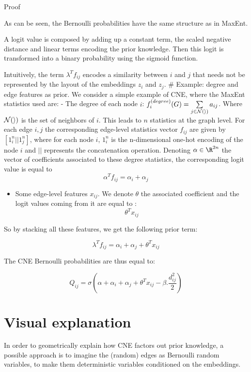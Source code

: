 Proof

As can be seen, the Bernoulli probabilities have the same structure as
in MaxEnt.

A logit value is composed by adding up a constant term, the scaled
negative distance and linear terms encoding the prior knowledge. Then
this logit is transformed into a binary probability using the sigmoid
function.

Intuitively, the term \(\lambda^Tf_{ij}\) encodes a similarity between
\(i\) and \(j\) that needs not be represented by the layout of the
embeddings \(z_i\) and \(z_j\). \# Example: degree and edge features as
prior. We consider a simple example of CNE, where the MaxEnt statistics
used are: - The degree of each node \(i\):
\(f_i^{(degree)}(G) = \sum\limits_{j\in \cal{N}(i)} a_{ij}\). Where
\(\cal{N}(i)\) is the set of neighbors of \(i\). This leads to \(n\)
statistics at the graph level. For each edge \(i,j\) the corresponding
edge-level statistics vector \(f_{ij}\) are given by \([1_i^n||1_j^n]\),
where for each node \(i\), \(1_i^n\) is the n-dimensional one-hot
encoding of the node \(i\) and \(||\) represents the concatenation
operation. Denoting \(\alpha \in \R^{2n}\) the vector of coefficients
associated to these degree statistics, the corresponding logit value is
equal to \[\alpha^Tf_{ij}=\alpha_i + \alpha_j\]

\begin{itemize}
\tightlist
\item
  Some edge-level features \(x_{ij}\). We denote \(\theta\) the
  associated coefficient and the logit values coming from it are equal
  to : \[\theta^T x_{ij}\]
\end{itemize}

So by stacking all these features, we get the following prior term:

\[\lambda^Tf_{ij}=\alpha_i + \alpha_j + \theta^T x_{ij}\]

The CNE Bernoulli probabilities are thus equal to:

\[ Q_{ij} = \sigma \left(\alpha + \alpha_i + \alpha_j + \theta^T x_{ij} - \beta.\frac{d_{ij}^2}{2} \right) \]

\hypertarget{visual-explanation}{%
\section{Visual explanation}\label{visual-explanation}}

In order to geometrically explain how CNE factors out prior knowledge, a
possible approach is to imagine the (random) edges as Bernoulli random
variables, to make them deterministic variables conditioned on the
embeddings.

